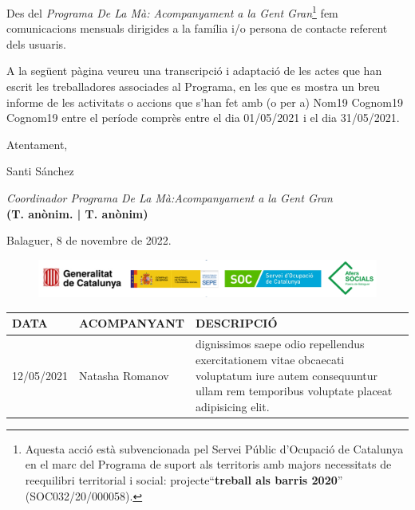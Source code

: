 \documentclass[a4paper,12pt]{elsarticle}  %
\begin{document}
Des del \textit{Programa De La Mà: Acompanyament a la Gent Gran}\footnote{Aquesta acció està subvencionada pel Servei Públic 
d'Ocupació de Catalunya en el marc del Programa de suport als territoris amb majors 
necessitats de reequilibri territorial i social: projecte``\textbf{treball als barris 2020}'' (SOC032/20/000058).} fem comunicacions mensuals
dirigides a la família i/o persona de contacte referent dels usuaris.


A la següent pàgina veureu una transcripció i adaptació de les actes que han escrit les treballadores associades
al Programa, en les que es mostra un breu informe de les activitats o accions que s'han fet amb (o per a) 
Nom19 Cognom19 Cognom19 entre el període comprès entre el dia 01/05/2021 i el dia 31/05/2021.

	\vspace{0.5cm}

\noindent Atentament,

\noindent Santi Sánchez

\noindent \textit{Coordinador Programa De La Mà:Acompanyament a la Gent Gran}\\
\textbf{(T. anònim. | T. anònim)}

	\vspace{0.5cm}

\noindent Balaguer, 8 de novembre de 2022.

	









\vfill

\FloatBarrier
\begin{figure}[h]
	\centering	
	\includegraphics[width=1\textwidth]{../IMATGES/logosGeneMinisterAferssocialsSoc.png}	
\end{figure}
\FloatBarrier	










\clearpage




	\begin{longtable}{p{}lp{}}
		

		
		\hline
		\textbf{DATA} & \textbf{ACOMPANYANT} & \textbf{DESCRIPCIÓ}\\
		\hline
			 12/05/2021 & Natasha Romanov & dignissimos saepe odio repellendus exercitationem vitae obcaecati voluptatum iure autem consequuntur ullam rem temporibus voluptate placeat adipisicing elit. \\ 
		
	\end{longtable}
\end{document}
